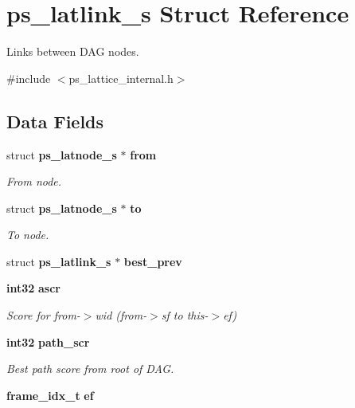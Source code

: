\section{ps\-\_\-latlink\-\_\-s \-Struct \-Reference}
\label{structps__latlink__s}


\-Links between \-D\-A\-G nodes.  




{\ttfamily \#include $<$ps\-\_\-lattice\-\_\-internal.\-h$>$}

\subsection*{\-Data \-Fields}
\begin{DoxyCompactItemize}
\item 
struct {\bf ps\-\_\-latnode\-\_\-s} $\ast$ {\bf from}\label{structps__latlink__s_ab0912c26d1472b4c5c07042c19ffb979}

\begin{DoxyCompactList}\small\item\em \-From node. \end{DoxyCompactList}\item 
struct {\bf ps\-\_\-latnode\-\_\-s} $\ast$ {\bf to}\label{structps__latlink__s_a782a15b1aeabf68983ca521e51f2c1e1}

\begin{DoxyCompactList}\small\item\em \-To node. \end{DoxyCompactList}\item 
struct {\bf ps\-\_\-latlink\-\_\-s} $\ast$ {\bfseries best\-\_\-prev}\label{structps__latlink__s_a8a3ffc0a780a09f8852cbe78c475809e}

\item 
{\bf int32} {\bf ascr}\label{structps__latlink__s_ae8a94ce1afb49292b044a0d4ba42b46d}

\begin{DoxyCompactList}\small\item\em \-Score for from-\/$>$wid (from-\/$>$sf to this-\/$>$ef) \end{DoxyCompactList}\item 
{\bf int32} {\bf path\-\_\-scr}\label{structps__latlink__s_a704fcfbdb57b1461325544c782289599}

\begin{DoxyCompactList}\small\item\em \-Best path score from root of \-D\-A\-G. \end{DoxyCompactList}\item 
{\bf frame\-\_\-idx\-\_\-t} {\bf ef}\label{structps__latlink__s_a59e2bf9a1c0dd6ce4ac76a17c58fbe36}


\end{DoxyCompactItemize}
